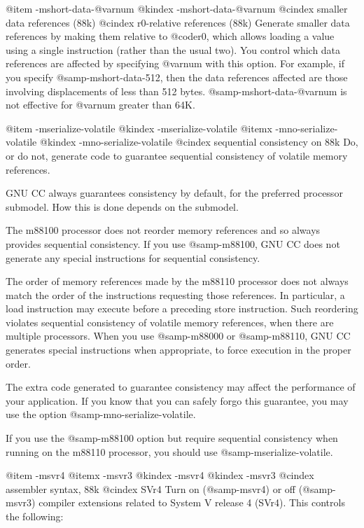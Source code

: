 {{@item -mshort-data-@var{num}
@kindex -mshort-data-@var{num}
@cindex smaller data references (88k)
@cindex r0-relative references (88k)
Generate smaller data references by making them relative to @code{r0},
which allows loading a value using a single instruction (rather than the
usual two).  You control which data references are affected by
specifying @var{num} with this option.  For example, if you specify
@samp{-mshort-data-512}, then the data references affected are those
involving displacements of less than 512 bytes.
@samp{-mshort-data-@var{num}} is not effective for @var{num} greater
than 64K.

@item -mserialize-volatile
@kindex -mserialize-volatile
@itemx -mno-serialize-volatile
@kindex -mno-serialize-volatile
@cindex sequential consistency on 88k
Do, or do not, generate code to guarantee sequential consistency of
volatile memory references.

GNU CC always guarantees consistency by default, for the preferred
processor submodel.  How this is done depends on the submodel.

The m88100 processor does not reorder memory references and so always
provides sequential consistency.  If you use @samp{-m88100}, GNU CC does
not generate any special instructions for sequential consistency.

The order of memory references made by the m88110 processor does not
always match the order of the instructions requesting those references.
In particular, a load instruction may execute before a preceding store
instruction.  Such reordering violates sequential consistency of
volatile memory references, when there are multiple processors.  When
you use @samp{-m88000} or @samp{-m88110}, GNU CC generates special
instructions when appropriate, to force execution in the proper order.

The extra code generated to guarantee consistency may affect the
performance of your application.  If you know that you can safely forgo
this guarantee, you may use the option @samp{-mno-serialize-volatile}.

If you use the @samp{-m88100} option but require sequential consistency
when running on the m88110 processor, you should use
@samp{-mserialize-volatile}.

@item -msvr4
@itemx -msvr3
@kindex -msvr4
@kindex -msvr3
@cindex assembler syntax, 88k
@cindex SVr4
Turn on (@samp{-msvr4}) or off (@samp{-msvr3}) compiler extensions
related to System V release 4 (SVr4).  This controls the following:

}}

